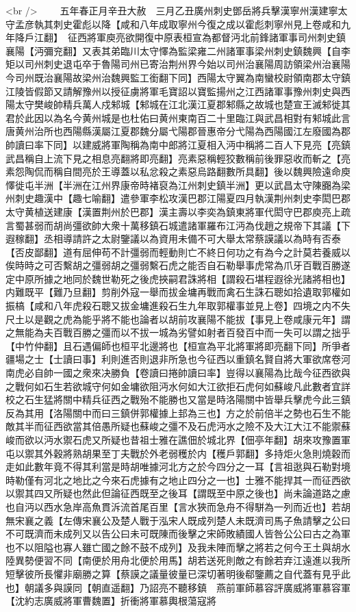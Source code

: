 <br />
　　五年春正月辛丑大赦　三月乙丑廣州刺史鄧岳將兵擊漢寧州漢建寧太守孟彦執其刺史霍彪以降【咸和八年成取寧州今復之成以霍彪刺寧州見上卷咸和九年降戶江翻】　征西將軍庾亮欲開復中原表桓宣為都督沔北前鋒諸軍事司州刺史鎮襄陽【沔彌兖翻】又表其弟臨川太守懌為監梁雍二州諸軍事梁州刺史鎮魏興【自李矩以司州刺史退屯卒于魯陽司州已寄治荆州界今始以司州治襄陽周訪領梁州治襄陽今司州既治襄陽故梁州治魏興監工銜翻下同】西陽太守翼為南蠻校尉領南郡太守鎮江陵皆假節又請解豫州以授征虜將軍毛寶詔以寶監揚州之江西諸軍事豫州刺史與西陽太守樊峻帥精兵萬人戍邾城【邾城在江北漢江夏郡邾縣之故城也楚宣王滅邾徙其君於此因以為名今黄州城是也杜佑曰黄州東南百二十里臨江與武昌相對有邾城此言唐黄州治所也西陽縣漢屬江夏郡魏分屬弋陽郡晉惠帝分弋陽為西陽國江左廢國為郡帥讀曰率下同】以建威將軍陶稱為南中郎將江夏相入沔中稱將二百人下見亮【亮鎮武昌稱自上流下見之相息亮翻將即亮翻】亮素惡稱輕狡數稱前後罪惡收而斬之【亮素怨陶侃而稱自間亮於王導蓋以私忿殺之素惡烏路翻數所具翻】後以魏興險遠命庾懌徙屯半洲【半洲在江州界康帝時褚裒為江州刺史鎮半洲】更以武昌太守陳嚻為梁州刺史趣漢中【趣七喻翻】遣參軍李松攻漢巴郡江陽夏四月執漢荆州刺史李閎巴郡太守黄植送建康【漢置荆州於巴郡】漢主壽以李奕為鎮東將軍代閎守巴郡庾亮上疏言蜀甚弱而胡尚彊欲帥大衆十萬移鎮石城遣諸軍羅布江沔為伐趙之規帝下其議【下遐稼翻】丞相導請許之太尉鑒議以為資用未備不可大舉太常蔡謨議以為時有否泰【否皮鄙翻】道有屈伸苟不計彊弱而輕動則亡不終日何功之有為今之計莫若養威以俟時時之可否繫胡之彊弱胡之彊弱繫石虎之能否自石勒舉事虎常為爪牙百戰百勝遂定中原所據之地同於魏世勒死之後虎挾嗣君誅將相【謂殺石堪程遐徐光諸將相也】内難既平【難乃旦翻】剪削外寇一舉而拔金墉再戰而禽石生誅石聰如拾遺取郭權如振槁【咸和八年虎殺石聰又拔金墉進殺石生九年取郭權事並見上卷】四境之内不失尺土以是觀之虎為能乎將不能也論者以胡前攻襄陽不能拔【事見上卷咸康元年】謂之無能為夫百戰百勝之彊而以不拔一城為劣譬如射者百發百中而一失可以謂之拙乎【中竹仲翻】且石遇偏師也桓平北邊將也【桓宣為平北將軍將即亮翻下同】所爭者疆場之士【士讀曰事】利則進否則退非所急也今征西以重鎮名賢自將大軍欲席卷河南虎必自帥一國之衆來决勝負【卷讀曰捲帥讀曰率】豈得以襄陽為比哉今征西欲與之戰何如石生若欲城守何如金墉欲阻沔水何如大江欲拒石虎何如蘇峻凡此數者宜詳校之石生猛將關中精兵征西之戰殆不能勝也又當是時洛陽關中皆舉兵擊虎今此三鎮反為其用【洛陽關中而曰三鎮併郭權據上邽為三也】方之於前倍半之勢也石生不能敵其半而征西欲當其倍愚所疑也蘇峻之彊不及石虎沔水之險不及大江大江不能禦蘇峻而欲以沔水禦石虎又所疑也昔祖士雅在譙佃於城北界【佃亭年翻】胡來攻豫置軍屯以禦其外穀將熟胡果至丁夫戰於外老弱穫於内【穫戶郭翻】多持炬火急則燒穀而走如此數年竟不得其利當是時胡唯據河北方之於今四分之一耳【言祖逖與石勒對境時勒僅有河北之地比之今來石虎據有之地止四分之一也】士雅不能捍其一而征西欲以禦其四又所疑也然此但論征西既至之後耳【謂既至中原之後也】尚未論道路之慮也自沔以西水急岸高魚貫泝流首尾百里【言水狹而急舟不得駢為一列而近也】若胡無宋襄之義【左傳宋襄公及楚人戰于泓宋人既成列楚人未既濟司馬子魚請擊之公曰不可既濟而未成列又以告公曰未可既陳而後擊之宋師敗績國人皆咎公公曰古之為軍也不以阻隘也寡人雖亡國之餘不鼓不成列】及我未陣而擊之將若之何今王土與胡水陸異勢便習不同【南便於用舟北便於用馬】胡若送死則敵之有餘若弃江遠進以我所短擊彼所長懼非廟勝之算【蔡謨之議量彼量已深切著明後郗鑒薦之自代蓋有見乎此也】朝議多與謨同【朝直遥翻】乃詔亮不聽移鎮　燕前軍師慕容評廣威將軍慕容軍【沈約志廣威將軍曹魏置】折衝將軍慕輿根蕩寇將